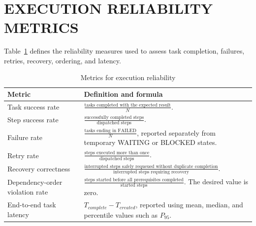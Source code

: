 \section{\uppercase{Execution Reliability Metrics}}
Table~\ref{tab:execution-metrics} defines the reliability measures used to assess task completion, failures, retries, recovery, ordering, and latency.
\begin{table}[H]
\centering
\caption{Metrics for execution reliability}
\label{tab:execution-metrics}
\begin{tabularx}{\textwidth}{|>{\centering\arraybackslash}p{}|>{\centering\arraybackslash}X|}
\hline
\textbf{Metric} & \textbf{Definition and formula} \\ \hline
Task success rate & $\frac{\text{tasks completed with the expected result}}{N}$. \\ \hline
Step success rate & $\frac{\text{successfully completed steps}}{\text{dispatched steps}}$. \\ \hline
Failure rate & $\frac{\text{tasks ending in FAILED}}{N}$, reported separately from temporary WAITING or BLOCKED states. \\ \hline
Retry rate & $\frac{\text{steps executed more than once}}{\text{dispatched steps}}$. \\ \hline
Recovery correctness & $\frac{\text{interrupted steps safely requeued without duplicate completion}}{\text{interrupted steps requiring recovery}}$. \\ \hline
Dependency-order violation rate & $\frac{\text{steps started before all prerequisites completed}}{\text{started steps}}$. The desired value is zero. \\ \hline
End-to-end task latency & $T_{complete}-T_{created}$, reported using mean, median, and percentile values such as $P_{95}$. \\ \hline
\end{tabularx}
\end{table}

